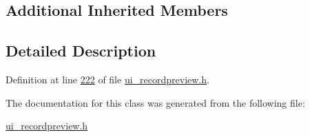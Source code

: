 \subsection*{Additional Inherited Members}


\subsection{Detailed Description}


Definition at line \hyperlink{a00053_source_l00222}{222} of file \hyperlink{a00053_source}{ui\+\_\+recordpreview.\+h}.



The documentation for this class was generated from the following file\+:\begin{DoxyCompactItemize}
\item 
\hyperlink{a00053}{ui\+\_\+recordpreview.\+h}\end{DoxyCompactItemize}
